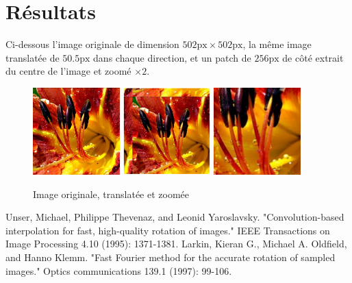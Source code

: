 \documentclass[12pt]{article}
\begin{document}
\section*{Résultats}
Ci-dessous l'image originale de dimension $502\text{px} \times 502 \text{px}$, la même image translatée de $50.5 \text{px}$ dans chaque direction, et un patch de $256\text{px}$ de côté extrait du centre de l'image et zoomé $\times 2$.

\begin{figure}[h]
	\includegraphics[width=0.3\textwidth]{flowers.png}
	\includegraphics[width=0.3\textwidth]{flowers-translated.png}
	\includegraphics[width=0.3\textwidth]{flowers-zoomed.png}
  \caption{Image originale, translatée et zoomée}
\end{figure}
\begin{thebibliography}{2}

  Unser, Michael, Philippe Thevenaz, and Leonid Yaroslavsky. 
  "Convolution-based interpolation for fast, high-quality rotation of images." 
  IEEE Transactions on Image Processing 4.10 (1995): 1371-1381.
  Larkin, Kieran G., Michael A. Oldfield, and Hanno Klemm. 
  "Fast Fourier method for the accurate rotation of sampled images." 
  Optics communications 139.1 (1997): 99-106.

\end{thebibliography}
\end{document}
